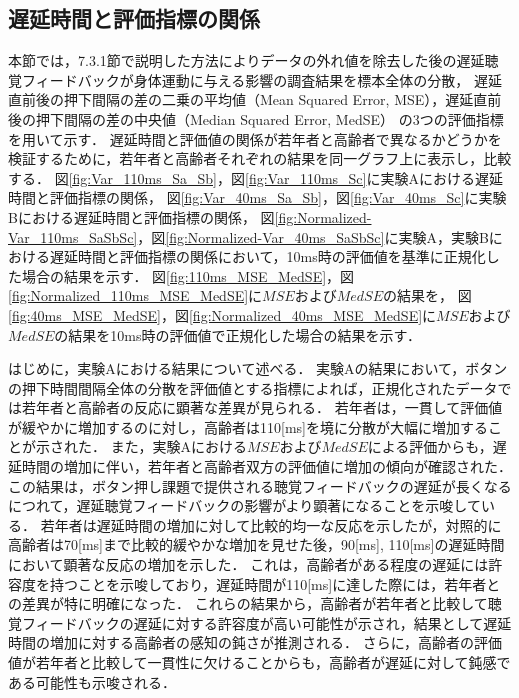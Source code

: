 \subsection{遅延時間と評価指標の関係}
本節では，7.3.1節で説明した方法によりデータの外れ値を除去した後の遅延聴覚フィードバックが身体運動に与える影響の調査結果を標本全体の分散，
遅延直前後の押下間隔の差の二乗の平均値（Mean Squared Error, MSE），遅延直前後の押下間隔の差の中央値（Median Squared Error, MedSE）
の3つの評価指標を用いて示す．
遅延時間と評価値の関係が若年者と高齢者で異なるかどうかを検証するために，若年者と高齢者それぞれの結果を同一グラフ上に表示し，比較する．
図\ref{fig:Var_110ms_Sa_Sb}，図\ref{fig:Var_110ms_Sc}に実験Aにおける遅延時間と評価指標の関係，
図\ref{fig:Var_40ms_Sa_Sb}，図\ref{fig:Var_40ms_Sc}に実験Bにおける遅延時間と評価指標の関係，
図\ref{fig:Normalized-Var_110ms_SaSbSc}，図\ref{fig:Normalized-Var_40ms_SaSbSc}に実験A，実験Bにおける遅延時間と評価指標の関係において，10ms時の評価値を基準に正規化した場合の結果を示す．
図\ref{fig:110ms_MSE_MedSE}，図\ref{fig:Normalized_110ms_MSE_MedSE}に$MSE$および$MedSE$の結果を，
図\ref{fig:40ms_MSE_MedSE}，図\ref{fig:Normalized_40ms_MSE_MedSE}に$MSE$および$MedSE$の結果を10ms時の評価値で正規化した場合の結果を示す．

はじめに，実験Aにおける結果について述べる．
実験Aの結果において，ボタンの押下時間間隔全体の分散を評価値とする指標によれば，正規化されたデータでは若年者と高齢者の反応に顕著な差異が見られる．
若年者は，一貫して評価値が緩やかに増加するのに対し，高齢者は110[ms]を境に分散が大幅に増加することが示された．
また，実験Aにおける$MSE$および$MedSE$による評価からも，遅延時間の増加に伴い，若年者と高齢者双方の評価値に増加の傾向が確認された．
この結果は，ボタン押し課題で提供される聴覚フィードバックの遅延が長くなるにつれて，遅延聴覚フィードバックの影響がより顕著になることを示唆している．
若年者は遅延時間の増加に対して比較的均一な反応を示したが，対照的に高齢者は70[ms]まで比較的緩やかな増加を見せた後，90[ms], 110[ms]の遅延時間において顕著な反応の増加を示した．
これは，高齢者がある程度の遅延には許容度を持つことを示唆しており，遅延時間が110[ms]に達した際には，若年者との差異が特に明確になった．
これらの結果から，高齢者が若年者と比較して聴覚フィードバックの遅延に対する許容度が高い可能性が示され，結果として遅延時間の増加に対する高齢者の感知の鈍さが推測される．
さらに，高齢者の評価値が若年者と比較して一貫性に欠けることからも，高齢者が遅延に対して鈍感である可能性も示唆される．

